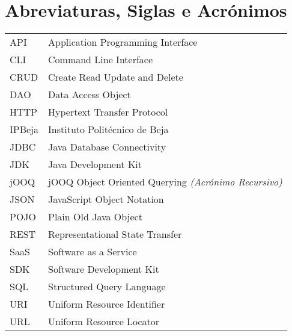 \chapter{Abreviaturas, Siglas e Acrónimos}

\begin{longtable}{p{} p{}}

  API    & Application Programming Interface                           \\
  CLI    & Command Line Interface                                      \\
  CRUD   & Create Read Update and Delete                               \\
  DAO    & Data Access Object                                          \\
  HTTP   & Hypertext Transfer Protocol                                 \\
  IPBeja & Instituto Politécnico de Beja                               \\
  JDBC   & Java Database Connectivity                                  \\
  JDK    & Java Development Kit                                        \\
  jOOQ   & jOOQ Object Oriented Querying \textit{(Acrónimo Recursivo)} \\
  JSON   & JavaScript Object Notation                                  \\
  POJO   & Plain Old Java Object                                       \\
  REST   & Representational State Transfer                             \\
  SaaS   & Software as a Service                                       \\
  SDK    & Software Development Kit                                    \\
  SQL    & Structured Query Language                                   \\
  URI    & Uniform Resource Identifier                                 \\
  URL    & Uniform Resource Locator
\end{longtable}
